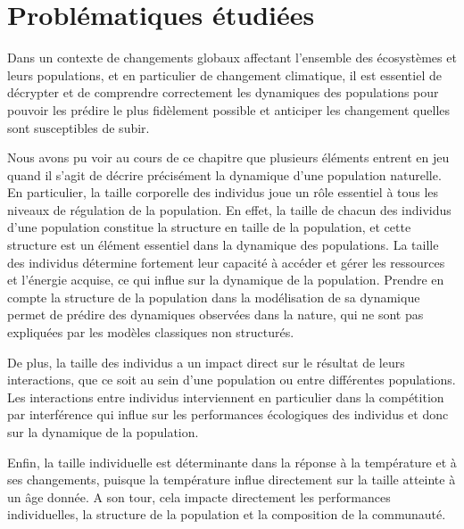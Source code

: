 \chapter{Problématiques étudiées}

Dans un contexte de changements globaux affectant l'ensemble des écosystèmes et
leurs populations, et en particulier de changement climatique, il est
essentiel de décrypter et de comprendre correctement les dynamiques des
populations pour pouvoir les prédire le plus fidèlement possible et anticiper
les changement quelles sont susceptibles de subir.

Nous avons pu voir au cours de ce chapitre que plusieurs éléments entrent
en jeu quand il s'agit de décrire précisément la dynamique d'une population
naturelle. En particulier, la taille corporelle des individus joue un rôle
essentiel à tous les niveaux de régulation de la population. En effet, la taille
de chacun des individus d'une population constitue la structure en taille de la
population, et cette structure est un élément essentiel dans la
dynamique des populations. La taille des individus détermine fortement
leur capacité à accéder et gérer les ressources et l'énergie acquise, ce qui
influe sur la dynamique de la population. Prendre en compte la structure de la
population dans la modélisation de sa dynamique permet de prédire des dynamiques
observées dans la nature, qui ne sont pas expliquées par les modèles classiques
non structurés.

De plus, la taille des individus a un impact direct sur le résultat de leurs
interactions, que ce soit au sein d'une population ou entre différentes
populations. Les interactions entre individus interviennent en particulier dans
la compétition par interférence qui influe sur les performances écologiques des
individus et donc sur la dynamique de la population. 

Enfin, la taille individuelle est déterminante dans la réponse à la température
et à ses changements, puisque la température influe directement sur la taille
atteinte à un âge donnée. A son tour, cela impacte directement les performances
individuelles, la structure de la population et la composition de la communauté. 

